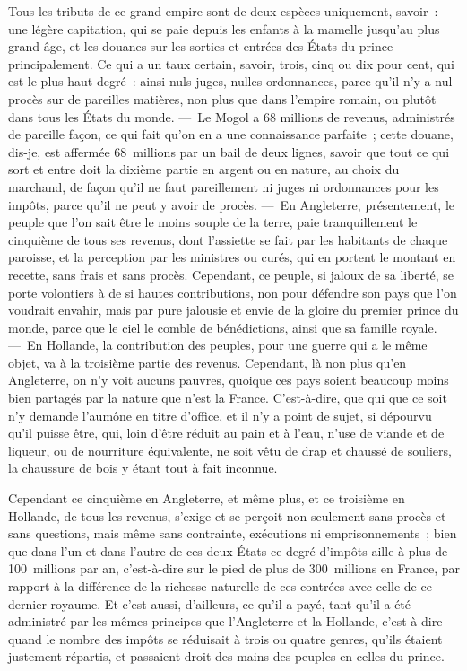 \documentclass[french,twoside]{book} %
\begin{document}
Tous les tributs de ce grand empire sont de deux espèces uniquement, savoir : une légère capitation, qui se paie depuis les enfants à la mamelle jusqu’au plus grand âge, et les douanes sur les sorties et entrées des États du prince principalement. Ce qui a un taux certain, savoir, trois, cinq ou dix pour cent, qui est le plus haut degré : ainsi nuls juges, nulles ordonnances, parce qu’il n’y a nul procès sur de pareilles matières, non plus que dans l’empire romain, ou plutôt dans tous les États du monde. — Le Mogol a 68 millions de revenus, administrés de pareille façon, ce qui fait qu’on en a une connaissance parfaite ; cette douane, dis-je, est affermée 68 millions par un bail de deux lignes, savoir que tout ce qui sort et entre doit la dixième partie en argent ou en nature, au choix du marchand, de façon qu’il ne faut pareillement ni juges ni ordonnances pour les impôts, parce qu’il ne peut y avoir de procès. — En Angleterre, présentement, le peuple que l’on sait être le moins souple de la terre, paie tranquillement le cinquième de tous ses revenus, dont l’assiette se fait par les habitants de chaque paroisse, et la perception par les ministres ou curés, qui en portent le montant en recette, sans frais et sans procès. Cependant, ce peuple, si jaloux de sa liberté, se porte volontiers à de si hautes contributions, non pour défendre son pays que l’on voudrait envahir, mais par pure jalousie et envie de la gloire du premier prince du monde, parce que le ciel le comble de bénédictions, ainsi que sa famille royale. — En Hollande, la contribution des peuples, pour une guerre qui a le même objet, va à la troisième partie des revenus. Cependant, là non plus qu’en Angleterre, on n’y voit aucuns pauvres, quoique ces pays soient beaucoup moins bien partagés par la nature que n’est la France. C’est-à-dire, que qui que ce soit n’y demande l’aumône en titre d’office, et il n’y a point de sujet, si dépourvu qu’il puisse être, qui, loin d’être réduit au pain et à l’eau, n’use de viande et de liqueur, ou de nourriture équivalente, ne soit vêtu de drap et chaussé de souliers, la chaussure de bois y étant tout à fait inconnue.\par
Cependant ce cinquième en Angleterre, et même plus, et ce troisième en Hollande, de tous les revenus, s’exige et se perçoit non seulement sans procès et sans questions, mais même sans contrainte, exécutions ni emprisonnements ; bien que dans l’un et dans l’autre de ces deux États ce degré d’impôts aille à plus de 100 millions par an, c’est-à-dire sur le pied de plus de 300 millions en France, par rapport à la différence de la richesse naturelle de ces contrées avec celle de ce dernier royaume. Et c’est aussi, d’ailleurs, ce qu’il a payé, tant qu’il a été administré par les mêmes principes que l’Angleterre et la Hollande, c’est-à-dire quand le nombre des impôts se réduisait à trois ou quatre genres, qu’ils étaient justement répartis, et passaient droit des mains des peuples en celles du prince.\par
\end{document}
